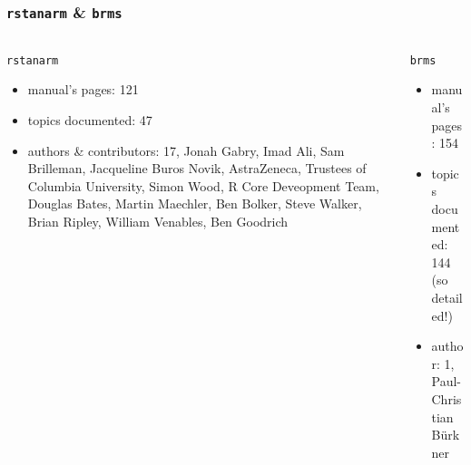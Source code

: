 \documentclass[handout]{beamer}\usepackage[]{graphicx}\usepackage[]{color}
\begin{document}
 

\begin{frame}
\frametitle{\texttt{rstanarm} \& \texttt{brms}}

\begin{columns}[onlytextwidth,t]
\begin{column}{0.48\textwidth}
\texttt{rstanarm} \\
\begin{itemize}
\item manual's pages: 121
\item topics documented: 47
\item authors \& contributors: 17, Jonah Gabry, Imad Ali, Sam Brilleman, Jacqueline Buros Novik, AstraZeneca, Trustees of Columbia University, Simon Wood, R Core Deveopment Team, Douglas Bates, Martin Maechler, Ben Bolker, Steve Walker, Brian Ripley, William Venables, Ben Goodrich
\end{itemize}
\end{column}
\begin{column}{0.48\textwidth}  
\texttt{brms} \\
\begin{itemize}
\item manual's pages: 154
\item topics documented: 144 (so detailed!)
\item author: 1, Paul-Christian B\"{u}rkner \\
\end{itemize}
\end{column}
\end{columns}

\end{frame}

\end{document}

